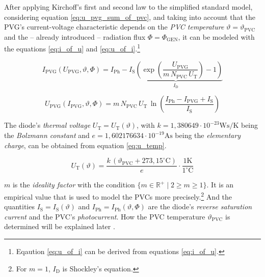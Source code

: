 After applying Kirchoff's first and second law to the simplified standard model, considering equation \ref{eq:u_pvg_sum_of_pvc}, and taking into account that the PVG's current-voltage characteristic depends on the \emph{PVC temperature} $\vartheta = \vartheta_{\mathrm{PVC}}$ and the -- already introduced -- radiation flux $\Phi = \Phi_{\mathrm{GEN}}$, it can be modeled with the equations \ref{eq:i_of_u} and \ref{eq:u_of_i}.\footnote{Eqaution \ref{eq:u_of_i} can be derived from equations \ref{eq:i_of_u}.}
\begin{center}
	\begin{equation} \label{eq:i_of_u}
		I_{\mathrm{PVG}}\left(U_{\mathrm{PVG}}, \vartheta, \Phi\right) = I_{\mathrm{Ph}} - \underbrace{I_{\mathrm{S}} \left( \exp \left(\frac{U_{\mathrm{PVG}}}{m \, N_{\mathrm{PVC}} \, U_{\mathrm{T}} } \right) - 1  \right)}_{I_{\mathrm{D}}}
	\end{equation}
\end{center}
\begin{center}
	\begin{equation} \label{eq:u_of_i}
		U_{\mathrm{PVG}}\left(I_{\mathrm{PVG}}, \vartheta, \Phi\right) = m \, N_{\mathrm{PVC}} \, U_{\mathrm{T}} \, \ln \left( \frac{I_{\mathrm{Ph}} - I_{\mathrm{PVG}} + I_{\mathrm{S}}}{I_{\mathrm{S}}} \right)
	\end{equation}
\end{center}
The diode's \emph{thermal voltage} $U_{\mathrm{T}} = U_{\mathrm{T}}\left( \vartheta \right)$, with $k = 1,380649 \cdot 10^{-23} \mathrm{Ws/K}$ being the \emph{Bolzmann constant} and $e = 1,602176634\cdot10^{-19} \mathrm{As}$ being the \emph{elementary charge}, can be obtained from equation \ref{eq:u_temp}.
\begin{center}
	\begin{equation} \label{eq:u_temp}
		U_{\mathrm{T}}\left( \vartheta \right) = \frac{ k \, \left( \vartheta_{\mathrm{PVC}} + 273,15^\circ \mathrm{C} \right) }{e} \cdot \frac{\mathrm{1K}}{1^\circ \mathrm{C}}
	\end{equation}
\end{center}
$m$ is the \emph{ideality factor} with the condition $\{m \in \mathbb{R}^+ \mid 2 \geq m \geq 1 \}$. It is an empirical value that is used to model the PVCs more precisely.\footnote{For $m = 1$, $I_\mathrm{D}$ is Shockley's equation.} And the quantities $I_{\mathrm{S}} = I_{\mathrm{S}}\left( \vartheta \right)$ and $I_{\mathrm{Ph}} = I_{\mathrm{Ph}}\left(\vartheta, \Phi\right)$ are the diode's \emph{reverse saturation current} and the PVC's \emph{photocurrent}. How the PVC temperature $\vartheta_{\mathrm{PVC}}$ is determined will be explained later \cite{Prechtl:2006, Mertens:2015, Tietze:2016, Wagner:2018, Elert:2020}. 

